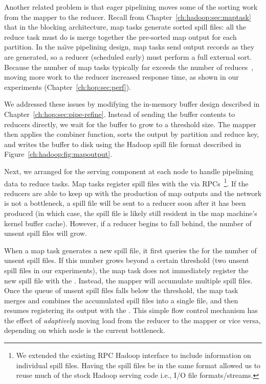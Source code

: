 Another related problem is that eager pipelining moves some of the sorting work
from the mapper to the reducer.  Recall from
Chapter~\ref{ch:hadoop:sec:maptask} that in the blocking architecture, map
tasks generate sorted spill files: all the reduce task must do is merge
together the pre-sorted map output for each partition.  In the na\"{\i}ve
pipelining design, map tasks send output records as they are generated, so a
reducer (scheduled early) must perform a full external sort.  Because the
number of map tasks typically far exceeds the number of
reduces~\cite{mapreduce-osdi}, moving more work to the reducer increased
response time, as shown in our experiments (Chapter~\ref{ch:hop:sec:perf}).

We addressed these issues by modifying the in-memory buffer design described in
Chapter~\ref{ch:hop:sec:pipe-refine}.  Instead of sending the buffer contents
to reducers directly, we wait for the buffer to grow to a threshold size.  The
mapper then applies the combiner function, sorts the output by partition and
reduce key, and writes the buffer to disk using the Hadoop spill file format
described in Figure~\ref{ch:hadoop:fig:mapoutput}.

Next, we arranged for the {\TT} serving component at each node to handle
pipelining data to reduce tasks.  Map tasks register spill files with the {\TT}
via RPCs~\footnote{We extended the existing RPC Hadoop interface to include
information on individual spill files.  Having the spill files be in the same
format allowed us to reuse much of the stock Hadoop serving code i.e., I/O file
formats/streams.}.  If the reducers are able to keep up with the production of
map outputs and the network is not a bottleneck, a spill file will be sent to a
reducer soon after it has been produced (in which case, the spill file is
likely still resident in the map machine's kernel buffer cache).  However, if a
reducer begins to fall behind, the number of unsent spill files will grow.

When a map task generates a new spill file, it first queries the {\TT} for the
number of unsent spill files.  If this number grows beyond a certain threshold
(two unsent spill files in our experiments), the map task does not immediately
register the new spill file with the {\TT}.  Instead, the mapper will
accumulate multiple spill files.  Once the queue of unsent spill files falls
below the threshold, the map task merges and combines the accumulated spill
files into a single file, and then resumes registering its output with the
{\TT}.  This simple flow control mechanism has the effect of {\em adaptively}
moving load from the reducer to the mapper or vice versa, depending on which
node is the current bottleneck.

